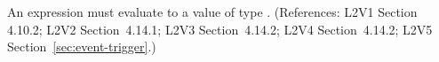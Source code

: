 An \Event {} expression must evaluate to a value of type
.  (References: L2V1 Section 4.10.2; L2V2 Section~4.14.1;
L2V3 Section~4.14.2; L2V4 Section~4.14.2; L2V5 Section~\ref{sec:event-trigger}.)
